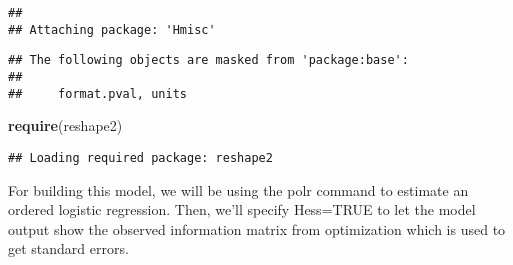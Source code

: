 \documentclass[]{article}
\newenvironment{Shaded}{\begin{snugshade}}{\end{snugshade}}
\newcommand{\KeywordTok}[1]{\textcolor[rgb]{0.13,0.29,0.53}{\textbf{#1}}}
\newcommand{\DataTypeTok}[1]{\textcolor[rgb]{0.13,0.29,0.53}{#1}}
\newcommand{\StringTok}[1]{\textcolor[rgb]{0.31,0.60,0.02}{#1}}
\newcommand{\OtherTok}[1]{\textcolor[rgb]{0.56,0.35,0.01}{#1}}
\newcommand{\OperatorTok}[1]{\textcolor[rgb]{0.81,0.36,0.00}{\textbf{#1}}}
\newcommand{\NormalTok}[1]{#1}
\begin{document}
\begin{verbatim}
## 
## Attaching package: 'Hmisc'
\end{verbatim}

\begin{verbatim}
## The following objects are masked from 'package:base':
## 
##     format.pval, units
\end{verbatim}

\begin{Shaded}
\begin{Highlighting}[]
\KeywordTok{require}\NormalTok{(reshape2)}
\end{Highlighting}
\end{Shaded}

\begin{verbatim}
## Loading required package: reshape2
\end{verbatim}

For building this model, we will be using the polr command to estimate
an ordered logistic regression. Then, we'll specify Hess=TRUE to let the
model output show the observed information matrix from optimization
which is used to get standard errors.

\begin{Shaded}
\end{Shaded}
\end{document}
